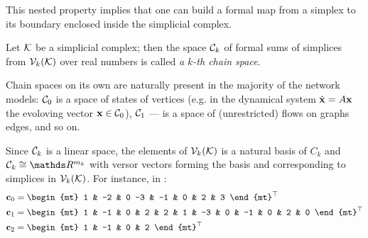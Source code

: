 This nested property implies that one can build a formal map from a simplex to its boundary enclosed inside the simplicial complex. 

\begin{definition}
      Let \( \mathcal{K} \) be a simplicial complex; then the space \( \mathcal{C}_k \) of formal sums of simplices from \( \mathcal{V}_{k}(\mathcal{K}) \) over real numbers is called \emph{a \( k\)-th chain space}.

\end{definition}


Chain spaces on its own are naturally present in the majority of the network models: \( \mathcal{C}_0 \) is a space of states of vertices (e.g. in the dynamical system \( \dot{ \mathbf{x} } = A \mathbf{x} \) the evoloving vector \( \mathbf{x} \in \mathcal{C}_0 \)), \( \mathcal{C}_1 \) --- is a space of (unrestricted) flows on graphs edges, and so on.




Since \( \mathcal{C}_k \) is a linear space, the elements of \( \mathcal{V}_{k}(\mathcal{K})\) is a natural basis of \( C_k \) and \( \mc C_k \cong \ds R^{m_k } \) with versor vectors forming the basis and corresponding to simplices in \( \mathcal{V}_{k}(\mathcal{K}) \). For instance, in :
\begin{equation}
      \begin{aligned}
            \b c_0 & =  \begin{mt}
                  1 & -2 & 0 -3 & -1 & 0 & 2 & 3
            \end{mt}^\top \\
            \b c_1 & =  \begin{mt}
            1 & -1 & 0 & 2 & 2 & 1 & -3 & 0 & -1 & 0 & 2 & 0
            \end{mt}^\top \\
            \b c_2 & = \begin{mt}
                  1 & -1 & 0 & 2
            \end{mt}^\top 
      \end{aligned}
\end{equation} 


